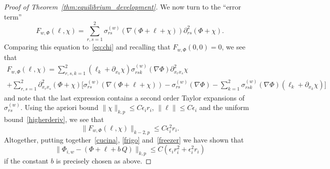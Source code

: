 \documentclass[10pt]{amsart}
\theoremstyle{definition}\newtheorem{defi}[theo]{Definition}\newtheorem{rema}[theo]{Remark}\newtheorem{exam}[theo]{Example}\newtheorem{exem}[theo]{Example}\newtheorem{nota}[theo]{Notation}
\newcommand{\norm}[1]{\lVert #1 \rVert}
\newcommand{\eps}{\epsilon}
\begin{document}
\begin{proof}[Proof of Theorem~\ref{thm:equilibrium_development}]
We now turn to the ``error term''
\begin{equation}
F_{w,\Phi}(\ell,\chi) = \sum_{r,s=1}^2 \sigma_{rs}^{(w)}(\nabla ({\Phi} + \ell + {\chi})) \partial^2_{rs} (\Phi + \chi).
\end{equation}
Comparing this equation to~\eqref{eq:chi} and recalling that $F_{w,\Phi}(0,0)=0$, we see that
\begin{multline}
F_{w,\Phi}(\ell,\chi)= \sum_{r,s,k=1}^2(\ell_k+\partial_{x_k}\chi)\sigma^{(w)}_{rsk}(\nabla\Phi) \partial^2_{x_r x_s}\chi \\+
\sum_{r,s=1}^2\partial^2_{x_r x_s}(\Phi+\chi)\Big[
\sigma^{(w)}_{rs}(\nabla ({\Phi} + \ell + {\chi}))-\sigma^{(w)}_{rs}(\nabla\Phi)-\sum_{k=1}^2\sigma^{(w)}_{rsk}(\nabla\Phi)(\ell_k+\partial_{x_k}\chi)\Big]
\end{multline}
and note that the last expression contains a second order Taylor expansions of $\sigma_{rs}^{(w)}$. Using the apriori bound $\norm{ \chi}_{k, p} \leq C \eps_i r_i$, $\|\ell\|\le C\epsilon_i$ and the uniform bound~\eqref{higherderiv}, we see that
\begin{equation}\label{freezer}
\norm{F_{w,\Phi}(\ell,\chi)}_{k-2, p} \leq C \eps_i^2 r_i.
\end{equation}
Altogether, putting together~\eqref{cucina}, \eqref{frigo} and~\eqref{freezer} we have shown that
\begin{equation}\label{ottperPhi}
\|\Phi_{i,w}-(\Phi+\ell+b\,Q)\|_{k,p}\le C\left(\epsilon_i r_i^2+\epsilon_i^2 r_i\right)
\end{equation}
if the constant $b$ is precisely chosen as above.


\end{proof}
\end{document}
